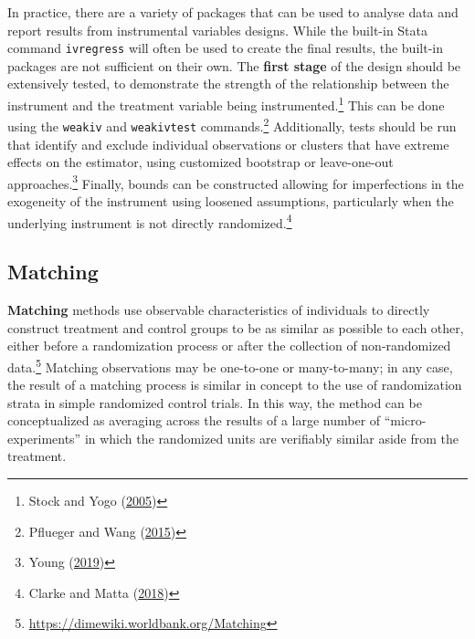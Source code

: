 \documentclass[
]{book}
\begin{document}
In practice, there are a variety of packages that can be used
to analyse data and report results from instrumental variables designs.
While the built-in Stata command \texttt{ivregress} will often be used
to create the final results, the built-in packages are not sufficient on their own.
The \textbf{first stage} of the design should be extensively tested,
to demonstrate the strength of the relationship between
the instrument and the treatment variable being instrumented.\footnote{Stock and Yogo (\protect\hyperlink{ref-stock2005weak}{2005})}
This can be done using the \texttt{weakiv} and \texttt{weakivtest} commands.\footnote{Pflueger and Wang (\protect\hyperlink{ref-pfluegerwang2015}{2015})}
Additionally, tests should be run that identify and exclude individual
observations or clusters that have extreme effects on the estimator,
using customized bootstrap or leave-one-out approaches.\footnote{Young (\protect\hyperlink{ref-young2017consistency}{2019})}
Finally, bounds can be constructed allowing for imperfections
in the exogeneity of the instrument using loosened assumptions,
particularly when the underlying instrument is not directly randomized.\footnote{Clarke and Matta (\protect\hyperlink{ref-clarke2018}{2018})}

\hypertarget{matching}{%
\subsection*{Matching}\label{matching}}

\textbf{Matching} methods use observable characteristics of individuals
to directly construct treatment and control groups to be as similar as possible
to each other, either before a randomization process
or after the collection of non-randomized data.\footnote{\url{https://dimewiki.worldbank.org/Matching}}
Matching observations may be one-to-one or many-to-many;
in any case, the result of a matching process
is similar in concept to the use of randomization strata
in simple randomized control trials.
In this way, the method can be conceptualized
as averaging across the results of a large number of ``micro-experiments''
in which the randomized units are verifiably similar aside from the treatment.
\end{document}
